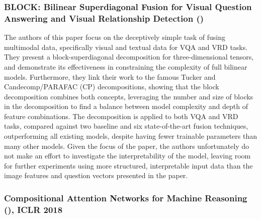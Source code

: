





\subsubsection*{BLOCK: Bilinear Superdiagonal Fusion for Visual Question Answering and Visual Relationship Detection (\cite{ben2019block})}

The authors of this paper focus on the deceptively simple task of fusing multimodal data, specifically visual and textual data for VQA and VRD tasks. They present a block-superdiagonal decomposition for three-dimensional tensors, and demonstrate its effectiveness in constraining the complexity of full bilinear models. Furthermore, they link their work to the famous Tucker and Candecomp/PARAFAC (CP) decompositions, showing that the block decomposition combines both concepts, leveraging the number and size of blocks in the decomposition to find a balance between model complexity and depth of feature combinations. The decomposition is applied to both VQA and VRD tasks, compared against two baseline and six state-of-the-art fusion techniques, outperforming all existing models, despite having fewer trainable parameters than many other models. Given the focus of the paper, the authors unfortunately do not make an effort to investigate the interpretability of the model, leaving room for further experiments using more structured, interpretable input data than the image features and question vectors presented in the paper.


\subsubsection*{Compositional Attention Networks for Machine Reasoning (\cite{hudson2018compositional}), ICLR 2018}

